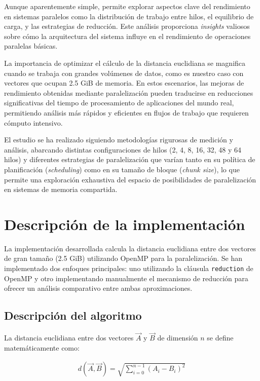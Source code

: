     Aunque aparentemente simple, permite explorar aspectos clave del rendimiento en sistemas paralelos como la distribución de trabajo entre hilos, el equilibrio de carga, y las estrategias de reducción. Este análisis proporciona \textit{insights} valiosos sobre cómo la arquitectura del sistema influye en el rendimiento de operaciones paralelas básicas.
    
    La importancia de optimizar el cálculo de la distancia euclidiana se magnifica cuando se trabaja con grandes volúmenes de datos, como es nuestro caso con vectores que ocupan 2.5 GiB de memoria. En estos escenarios, las mejoras de rendimiento obtenidas mediante paralelización pueden traducirse en reducciones significativas del tiempo de procesamiento de aplicaciones del mundo real, permitiendo análisis más rápidos y eficientes en flujos de trabajo que requieren cómputo intensivo.
    
    El estudio se ha realizado siguiendo metodologías rigurosas de medición y análisis, abarcando distintas configuraciones de hilos (2, 4, 8, 16, 32, 48 y 64 hilos) y diferentes estrategias de paralelización que varían tanto en su política de planificación (\textit{scheduling}) como en su tamaño de bloque (\textit{chunk size}), lo que permite una exploración exhaustiva del espacio de posibilidades de paralelización en sistemas de memoria compartida.
    
\newpage

\section{Descripción de la implementación}
    
    La implementación desarrollada calcula la distancia euclidiana entre dos vectores de gran tamaño (2.5 GiB) utilizando OpenMP para la paralelización. Se han implementado dos enfoques principales: uno utilizando la cláusula \texttt{reduction} de OpenMP y otro implementando manualmente el mecanismo de reducción para ofrecer un análisis comparativo entre ambas aproximaciones.

    \subsection{Descripción del algoritmo}

        La distancia euclidiana entre dos vectores $\vec{A}$ y $\vec{B}$ de dimensión $n$ se define matemáticamente como:
        
        \begin{align}
            d(\vec{A}, \vec{B}) = \sqrt{\sum_{i=0}^{n-1} (A_i - B_i)^2}
        \end{align}
        
